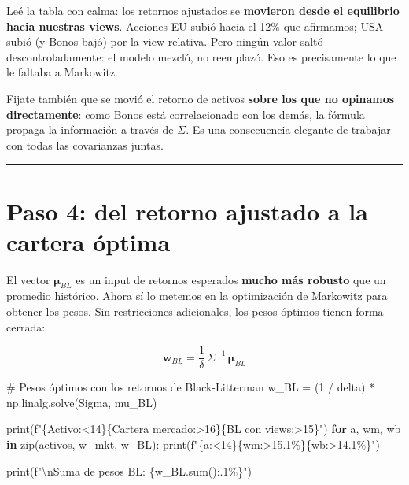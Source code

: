 \documentclass[
  spanish,
  letterpaper,
  DIV=11,
  numbers=noendperiod]{scrreprt}
\newenvironment{Shaded}{\begin{snugshade}}{\end{snugshade}}
\newcommand{\BuiltInTok}[1]{\textcolor[rgb]{0.00,0.23,0.31}{#1}}
\newcommand{\CharTok}[1]{\textcolor[rgb]{0.13,0.47,0.30}{#1}}
\newcommand{\CommentTok}[1]{\textcolor[rgb]{0.37,0.37,0.37}{#1}}
\newcommand{\ControlFlowTok}[1]{\textcolor[rgb]{0.00,0.23,0.31}{\textbf{#1}}}
\newcommand{\DecValTok}[1]{\textcolor[rgb]{0.68,0.00,0.00}{#1}}
\newcommand{\KeywordTok}[1]{\textcolor[rgb]{0.00,0.23,0.31}{\textbf{#1}}}
\newcommand{\NormalTok}[1]{\textcolor[rgb]{0.00,0.23,0.31}{#1}}
\newcommand{\OperatorTok}[1]{\textcolor[rgb]{0.37,0.37,0.37}{#1}}
\newcommand{\SpecialCharTok}[1]{\textcolor[rgb]{0.37,0.37,0.37}{#1}}
\newcommand{\SpecialStringTok}[1]{\textcolor[rgb]{0.13,0.47,0.30}{#1}}
\newcommand{\StringTok}[1]{\textcolor[rgb]{0.13,0.47,0.30}{#1}}
\begin{document}
Leé la tabla con calma: los retornos ajustados se \textbf{movieron desde
el equilibrio hacia nuestras views}. Acciones EU subió hacia el 12\% que
afirmamos; USA subió (y Bonos bajó) por la view relativa. Pero ningún
valor saltó descontroladamente: el modelo mezcló, no reemplazó. Eso es
precisamente lo que le faltaba a Markowitz.

Fijate también que se movió el retorno de activos \textbf{sobre los que
no opinamos directamente}: como Bonos está correlacionado con los demás,
la fórmula propaga la información a través de \(\Sigma\). Es una
consecuencia elegante de trabajar con todas las covarianzas juntas.

\begin{center}\rule{0.5\linewidth}{0.5pt}\end{center}

\chapter{Paso 4: del retorno ajustado a la cartera
óptima}\label{paso-4-del-retorno-ajustado-a-la-cartera-uxf3ptima}

El vector \(\boldsymbol{\mu}_{BL}\) es un input de retornos esperados
\textbf{mucho más robusto} que un promedio histórico. Ahora sí lo
metemos en la optimización de Markowitz para obtener los pesos. Sin
restricciones adicionales, los pesos óptimos tienen forma cerrada:

\[\mathbf{w}_{BL} = \frac{1}{\delta} \, \Sigma^{-1} \, \boldsymbol{\mu}_{BL}\]

\label{pesos-optimos}
\begin{Shaded}
\begin{Highlighting}[]
\CommentTok{\# Pesos óptimos con los retornos de Black{-}Litterman}
\NormalTok{w\_BL }\OperatorTok{=}\NormalTok{ (}\DecValTok{1} \OperatorTok{/}\NormalTok{ delta) }\OperatorTok{*}\NormalTok{ np.linalg.solve(Sigma, mu\_BL)}

\BuiltInTok{print}\NormalTok{(}\SpecialStringTok{f"}\SpecialCharTok{\{}\StringTok{\textquotesingle{}Activo\textquotesingle{}}\SpecialCharTok{:\textless{}14\}\{}\StringTok{\textquotesingle{}Cartera mercado\textquotesingle{}}\SpecialCharTok{:\textgreater{}16\}\{}\StringTok{\textquotesingle{}BL con views\textquotesingle{}}\SpecialCharTok{:\textgreater{}15\}}\SpecialStringTok{"}\NormalTok{)}
\ControlFlowTok{for}\NormalTok{ a, wm, wb }\KeywordTok{in} \BuiltInTok{zip}\NormalTok{(activos, w\_mkt, w\_BL):}
    \BuiltInTok{print}\NormalTok{(}\SpecialStringTok{f"}\SpecialCharTok{\{}\NormalTok{a}\SpecialCharTok{:\textless{}14\}\{}\NormalTok{wm}\SpecialCharTok{:\textgreater{}15.1\%\}\{}\NormalTok{wb}\SpecialCharTok{:\textgreater{}14.1\%\}}\SpecialStringTok{"}\NormalTok{)}

\BuiltInTok{print}\NormalTok{(}\SpecialStringTok{f"}\CharTok{\textbackslash{}n}\SpecialStringTok{Suma de pesos BL: }\SpecialCharTok{\{}\NormalTok{w\_BL}\SpecialCharTok{.}\BuiltInTok{sum}\NormalTok{()}\SpecialCharTok{:.1\%\}}\SpecialStringTok{"}\NormalTok{)}
\end{Highlighting}
\end{Shaded}
\end{document}

